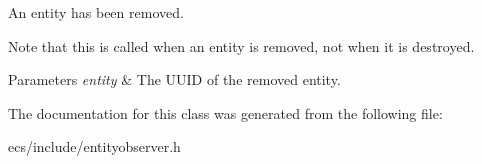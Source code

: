 An entity has been removed. 

Note that this is called when an entity is removed, not when it is destroyed.


\begin{DoxyParams}{Parameters}
{\em entity} & The U\-U\-I\-D of the removed entity. \\
\hline
\end{DoxyParams}


The documentation for this class was generated from the following file\-:\begin{DoxyCompactItemize}
\item 
ecs/include/entityobserver.\-h\end{DoxyCompactItemize}
